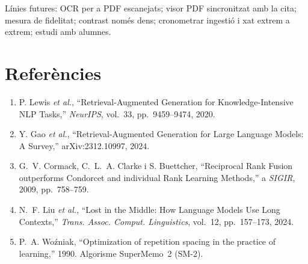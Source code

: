 \documentclass[10pt,a4paper,twoside]{article}
\begin{document}
Línies futures: OCR per a PDF escanejats; visor PDF sincronitzat amb la cita; mesura de fidelitat; contrast només dens; cronometrar ingestió i xat extrem a extrem; estudi amb \mbox{alumnes}.

\section*{Referències}
{\small
\setlength{\parskip}{2pt}
\sloppy
\begin{enumerate}
\item[{[1]}] P. Lewis \textit{et al.}, ``Retrieval-Augmented Generation for Knowledge-Intensive NLP Tasks,'' \textit{NeurIPS}, vol.~33, pp.~9459--9474, 2020.
\item[{[2]}] Y. Gao \textit{et al.}, ``Retrieval-Augmented Generation for Large Language Models: A Survey,'' arXiv:2312.10997, 2024.
\item[{[3]}] G.~V. Cormack, C.~L.~A. Clarke i S. Buettcher, ``Reciprocal Rank Fusion outperforms Condorcet and individual Rank Learning Methods,'' a \textit{SIGIR}, 2009, pp.~758--759.
\item[{[4]}] N.~F. Liu \textit{et al.}, ``Lost in the Middle: How Language Models Use Long Contexts,'' \textit{Trans. Assoc. Comput. Linguistics}, vol.~12, pp.~157--173, 2024.
\item[{[5]}] P.~A. Woźniak, ``Optimization of repetition spacing in the practice of learning,'' 1990. Algorisme SuperMemo~2 (SM-2).
\end{enumerate}
}
\end{document}
